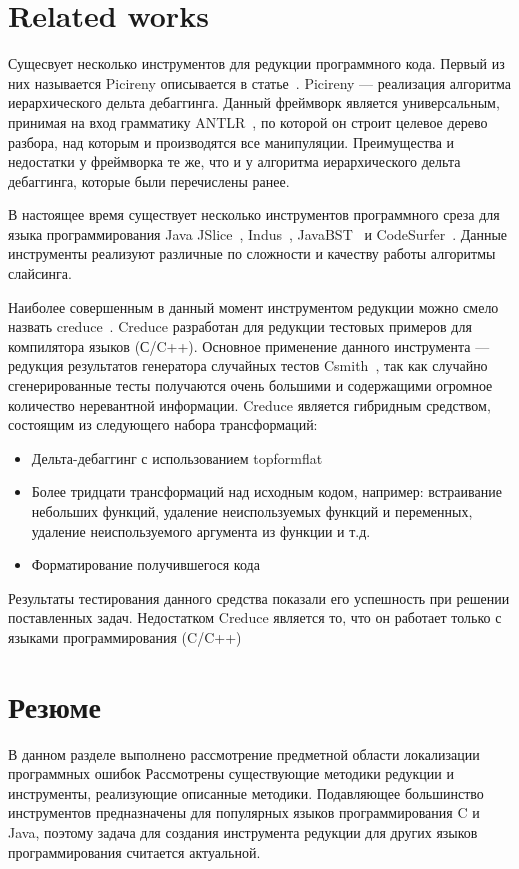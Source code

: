 \section{Related works}
Сущесвует несколько инструментов для редукции программного кода. Первый из них называется Picireny описывается в статье~\cite{hodovan2017tree}. Picireny --- реализация алгоритма иерархического дельта дебаггинга. Данный фреймворк является универсальным, принимая на вход грамматику ANTLR~\cite{parr2013definitive}, по которой он строит целевое дерево разбора, над которым и производятся все манипуляции. Преимущества и недостатки у фреймворка те же, что и у алгоритма иерархического дельта дебаггинга, которые были перечислены ранее. 

В настоящее время существует несколько инструментов программного среза для языка программирования Java JSlice~\cite{WR:04}, Indus~\cite{jayaraman2005kaveri}, JavaBST~\cite{abdallah2017javabst} и CodeSurfer~\cite{anderson2004codesurfer}. Данные инструменты реализуют различные по сложности и качеству работы алгоритмы слайсинга.


Наиболее совершенным в данный момент инструментом редукции можно смело назвать creduce~\cite{regehr2012test}. Creduce разработан для редукции тестовых примеров для компилятора языков (С/C++). Основное применение данного инструмента --- редукция результатов генератора случайных тестов Csmith~\cite{yang2011finding}, так как случайно сгенерированные тесты получаются очень большими и содержащими огромное количество неревантной информации. Creduce является гибридным средством, состоящим из следующего набора трансформаций:
\begin{itemize}
	\item Дельта-дебаггинг с использованием topformflat
	\item Более тридцати трансформаций над исходным кодом, например: встраивание небольших функций, удаление неиспользуемых функций и переменных, удаление неиспользуемого аргумента из функции и т.д.
	\item Форматирование получившегося кода
\end{itemize}
Результаты тестирования данного средства показали его успешность при решении поставленных задач. Недостатком Creduce является то, что он работает только с языками программирования (C/C++)  

\section{Резюме}
В данном разделе выполнено рассмотрение предметной области локализации программных ошибок Рассмотрены существу­ющие методики редукции и инструменты, реализующие описанные методики. Подавляющее большинство инструментов предназначены для популярных языков программирования C и Java, поэтому задача для создания инструмента редукции для других языков программирования считается актуальной.